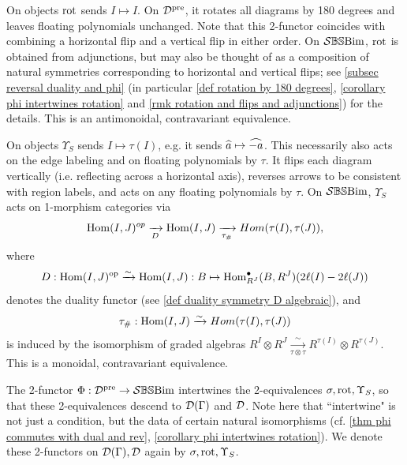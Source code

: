 \begin{defn}
On objects $\operatorname{rot}$ sends $I \mapsto I$. On $\mathcal{D}^{\operatorname{pre}}$, it rotates all diagrams by 180 degrees and leaves floating polynomials unchanged. Note that this 2-functor coincides with combining a horizontal flip and a vertical flip in either order.
On $\mathcal{S}\mathbb{BS}\text{Bim}$, $\operatorname{rot}$ is obtained from adjunctions, but may also be thought of as a composition of natural symmetries corresponding to horizontal and vertical flips; see \cref{subsec reversal duality and phi} (in particular \cref{def rotation by 180 degrees}, \cref{corollary phi intertwines rotation} and \cref{rmk rotation and flips and adjunctions}) for the details. 
This is an antimonoidal, contravariant equivalence.

On objects $\Upsilon_S$ sends $I \mapsto \tau(I)$, e.g. it sends $\widehat{a} \mapsto \widehat{-a}$. This necessarily also acts on the edge labeling and on floating polynomials by $\tau$. It flips each diagram vertically (i.e. reflecting across a horizontal axis), reverses arrows to be consistent with region labels, and acts on any floating polynomials by $\tau$. 
On $\mathcal{S}\mathbb{BS}\text{Bim}$, $\Upsilon_S$ acts on 1-morphism categories via 
$$\operatorname{Hom}(I,J)^{op} \xrightarrow[D]{} \operatorname{Hom}(I,J) \xrightarrow[\tau_{\#}]{} Hom(\tau(I),\tau(J)),$$ where
$$D: \operatorname{Hom}(I,J)^{\operatorname{op}}\xrightarrow{\sim} \operatorname{Hom}(I,J): B \mapsto \operatorname{Hom}^\bullet_{R^J}(B, R^J)(2\ell(I)-2\ell(J)) $$ 
denotes the duality functor (see \cref{def duality symmetry D algebraic}),
and 
$$\tau_{\#}:\operatorname{Hom}(I,J) \xrightarrow{\sim} Hom(\tau(I),\tau(J))$$
is induced by the isomorphism of graded algebras $R^I\otimes R^J \xrightarrow[\tau \otimes \tau]{\sim}R^{\tau(I)}\otimes R^{\tau(J)}.$ 
This is a monoidal, contravariant equivalence. 

The 2-functor $\Phi: \mathcal{D}^{\operatorname{pre}} \to \mathcal{S}\mathbb{BS}\text{Bim}$ intertwines the 2-equivalences $\sigma, \operatorname{rot}, \Upsilon_S$, so that these 2-equivalences descend to $\mathcal{D}(\Gamma)$ and $\mathcal{D}$. 
Note here that ``intertwine" is not just a condition, but the data of certain natural isomorphisms (cf. \cref{thm phi commutes with dual and rev}, \cref{corollary phi intertwines rotation}).
We denote these 2-functors on $\mathcal{D}(\Gamma), \mathcal{D}$ again by $\sigma, \operatorname{rot}, \Upsilon_S$.
\end{defn}


